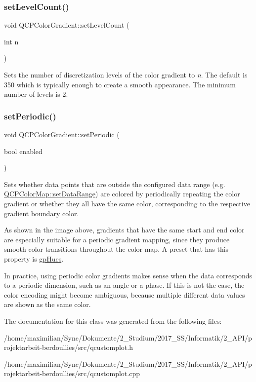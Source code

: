 \subsubsection{\texorpdfstring{set\+Level\+Count()}{setLevelCount()}}
{\footnotesize\ttfamily void Q\+C\+P\+Color\+Gradient\+::set\+Level\+Count (\begin{DoxyParamCaption}\item[{int}]{n }\end{DoxyParamCaption})}

Sets the number of discretization levels of the color gradient to {\itshape n}. The default is 350 which is typically enough to create a smooth appearance. The minimum number of levels is 2.

 \mbox{\label{class_q_c_p_color_gradient_a39d6448155fc00a219f239220d14bb39}} 
\subsubsection{\texorpdfstring{set\+Periodic()}{setPeriodic()}}
{\footnotesize\ttfamily void Q\+C\+P\+Color\+Gradient\+::set\+Periodic (\begin{DoxyParamCaption}\item[{bool}]{enabled }\end{DoxyParamCaption})}

Sets whether data points that are outside the configured data range (e.\+g. \hyperlink{class_q_c_p_color_map_a980b42837821159786a85b4b7dcb8774}{Q\+C\+P\+Color\+Map\+::set\+Data\+Range}) are colored by periodically repeating the color gradient or whether they all have the same color, corresponding to the respective gradient boundary color.



As shown in the image above, gradients that have the same start and end color are especially suitable for a periodic gradient mapping, since they produce smooth color transitions throughout the color map. A preset that has this property is \hyperlink{class_q_c_p_color_gradient_aed6569828fee337023670272910c9072a30efe58407acfb67939032f70213a130}{gp\+Hues}.

In practice, using periodic color gradients makes sense when the data corresponds to a periodic dimension, such as an angle or a phase. If this is not the case, the color encoding might become ambiguous, because multiple different data values are shown as the same color. 

The documentation for this class was generated from the following files\+:\begin{DoxyCompactItemize}
\item 
/home/maximilian/\+Sync/\+Dokumente/2\+\_\+\+Studium/2017\+\_\+\+S\+S/\+Informatik/2\+\_\+\+A\+P\+I/projektarbeit-\/berdoullies/src/qcustomplot.\+h\item 
/home/maximilian/\+Sync/\+Dokumente/2\+\_\+\+Studium/2017\+\_\+\+S\+S/\+Informatik/2\+\_\+\+A\+P\+I/projektarbeit-\/berdoullies/src/qcustomplot.\+cpp\end{DoxyCompactItemize}
